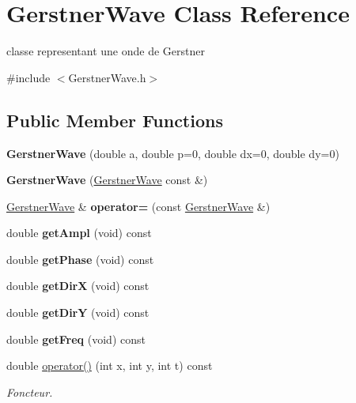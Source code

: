\hypertarget{class_gerstner_wave}{}\section{Gerstner\+Wave Class Reference}
\label{class_gerstner_wave}


classe representant une onde de Gerstner  




{\ttfamily \#include $<$Gerstner\+Wave.\+h$>$}

\subsection*{Public Member Functions}
\begin{DoxyCompactItemize}
\item 
\hypertarget{class_gerstner_wave_a5e8406c955d58067d88f079397ce7453}{}\label{class_gerstner_wave_a5e8406c955d58067d88f079397ce7453} 
{\bfseries Gerstner\+Wave} (double a, double p=0, double dx=0, double dy=0)
\item 
\hypertarget{class_gerstner_wave_aa9dc038a2f1f5e6753b953b150807f79}{}\label{class_gerstner_wave_aa9dc038a2f1f5e6753b953b150807f79} 
{\bfseries Gerstner\+Wave} (\hyperlink{class_gerstner_wave}{Gerstner\+Wave} const \&)
\item 
\hypertarget{class_gerstner_wave_af8f329cb3b8fd4eca6f7c45d76508629}{}\label{class_gerstner_wave_af8f329cb3b8fd4eca6f7c45d76508629} 
\hyperlink{class_gerstner_wave}{Gerstner\+Wave} \& {\bfseries operator=} (const \hyperlink{class_gerstner_wave}{Gerstner\+Wave} \&)
\item 
\hypertarget{class_gerstner_wave_a9173e1593c21d452065f6afab72a2dac}{}\label{class_gerstner_wave_a9173e1593c21d452065f6afab72a2dac} 
double {\bfseries get\+Ampl} (void) const
\item 
\hypertarget{class_gerstner_wave_a40681335f7ae8d2f673ecca5e2bc504f}{}\label{class_gerstner_wave_a40681335f7ae8d2f673ecca5e2bc504f} 
double {\bfseries get\+Phase} (void) const
\item 
\hypertarget{class_gerstner_wave_aaabdadec1007ce8a53dd26e8754cc59f}{}\label{class_gerstner_wave_aaabdadec1007ce8a53dd26e8754cc59f} 
double {\bfseries get\+DirX} (void) const
\item 
\hypertarget{class_gerstner_wave_a75c41324bcc401ea52d98c6ac5d464ee}{}\label{class_gerstner_wave_a75c41324bcc401ea52d98c6ac5d464ee} 
double {\bfseries get\+DirY} (void) const
\item 
\hypertarget{class_gerstner_wave_ada562c8aba8b74b428a3c19f6cb4a681}{}\label{class_gerstner_wave_ada562c8aba8b74b428a3c19f6cb4a681} 
double {\bfseries get\+Freq} (void) const
\item 
double \hyperlink{class_gerstner_wave_afc6bb905ba248bd5c8ca7be8b172dedb}{operator()} (int x, int y, int t) const
\begin{DoxyCompactList}\small\item\em Foncteur. \end{DoxyCompactList}\end{DoxyCompactItemize}

